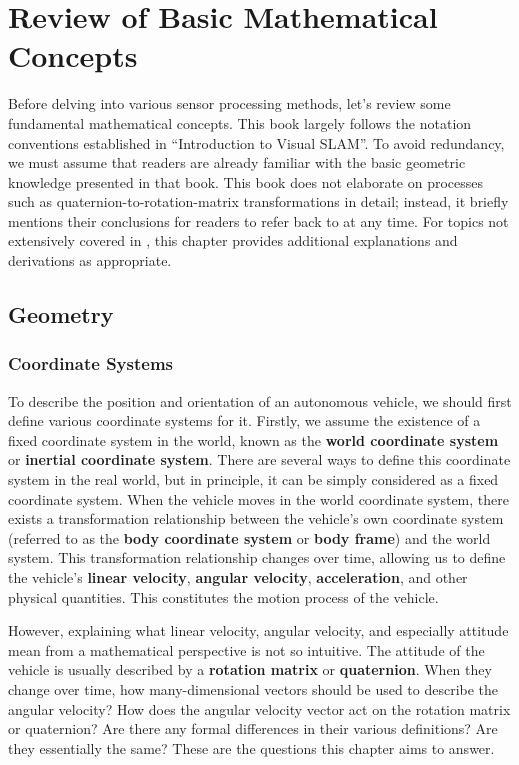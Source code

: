\thispagestyle{empty}

\chapter{Review of Basic Mathematical Concepts}
\label{sec:math-basics}
\thispagestyle{empty}

Before delving into various sensor processing methods, let's review some fundamental mathematical concepts. This book largely follows the notation conventions established in ``Introduction to Visual SLAM''\cite{Gao2017}. To avoid redundancy, we must assume that readers are already familiar with the basic geometric knowledge presented in that book. This book does not elaborate on processes such as quaternion-to-rotation-matrix transformations in detail; instead, it briefly mentions their conclusions for readers to refer back to at any time. For topics not extensively covered in \cite{Gao2017}, this chapter provides additional explanations and derivations as appropriate.

\newpage


\section{Geometry}
\subsection{Coordinate Systems}

To describe the position and orientation of an autonomous vehicle, we should first define various coordinate systems for it. Firstly, we assume the existence of a fixed coordinate system in the world, known as the \textbf{world coordinate system} or \textbf{inertial coordinate system}. There are several ways to define this coordinate system in the real world, but in principle, it can be simply considered as a fixed coordinate system. When the vehicle moves in the world coordinate system, there exists a transformation relationship between the vehicle's own coordinate system (referred to as the \textbf{body coordinate system} or \textbf{body frame}) and the world system. This transformation relationship changes over time, allowing us to define the vehicle's \textbf{linear velocity}, \textbf{angular velocity}, \textbf{acceleration}, and other physical quantities. This constitutes the motion process of the vehicle.

However, explaining what linear velocity, angular velocity, and especially attitude mean from a mathematical perspective is not so intuitive. The attitude of the vehicle is usually described by a \textbf{rotation matrix} or \textbf{quaternion}. When they change over time, how many-dimensional vectors should be used to describe the angular velocity? How does the angular velocity vector act on the rotation matrix or quaternion? Are there any formal differences in their various definitions? Are they essentially the same? These are the questions this chapter aims to answer.

